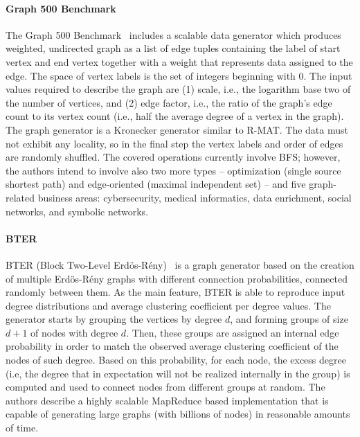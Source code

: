 \paragraph{Graph 500 Benchmark} The Graph 500 Benchmark~\cite{Graph500} includes
a scalable data generator which produces weighted, undirected graph as a list of
edge tuples containing the label of start vertex and end vertex together with a
weight that represents data assigned to the edge. The space of vertex  labels is
the set of integers beginning with 0. The input values required to describe the
graph are (1) scale, i.e., the logarithm base two of the number of vertices, and
(2) edge factor, i.e., the ratio of the graph's edge count to its vertex count
(i.e., half the average degree of a vertex in the graph). The graph generator is
a Kronecker generator similar to R-MAT. The data must not exhibit any locality,
so in the final step the vertex labels and order of edges are randomly shuffled.
The covered operations currently involve BFS; however, the authors intend to
involve also two more types -- optimization (single source shortest path) and
edge-oriented (maximal independent set) -- and five graph-related business areas:
cybersecurity, medical informatics, data enrichment, social networks, and
symbolic networks.

\paragraph{BTER} BTER (Block Two-Level
Erd\"{o}s-R\'{e}ny)~\cite{kolda2014scalable} is a graph generator based on the
creation of multiple Erd\"{o}s-R\'{e}ny graphs with different connection
probabilities, connected randomly between them. As the main feature, BTER is able
to reproduce input degree distributions and average clustering
coefficient per degree values. The generator starts by grouping the vertices
by degree $d$, and forming groups of size $d+1$ of nodes with degree $d$. Then, these
groups are assigned an internal edge probability in order to match the observed
average clustering coefficient of the nodes of such degree. Based on this
probability, for each node, the excess degree (i.e, the degree that in
expectation will not be realized internally in the group) is computed and used to connect
nodes from different groups at random. The authors describe a highly scalable
MapReduce based implementation that is capable of generating large graphs (with
billions of nodes) in reasonable amounts of time.

